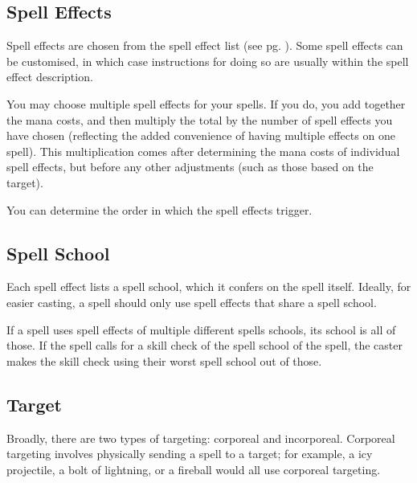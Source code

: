 \subsection{Spell Effects}
Spell effects are chosen from the spell effect list (see pg.
\pageref{spell-effect-list}). Some spell effects can be customised, in which
case instructions for doing so are usually within the spell effect description.

You may choose multiple spell effects for your spells. If you do, you add
together the mana costs, and then multiply the total by the number of spell
effects you have chosen (reflecting the added convenience of having multiple
effects on one spell). This multiplication comes after determining the mana
costs of individual spell effects, but before any other adjustments (such as
those based on the target).

You can determine the order in which the spell effects trigger.

\subsection{Spell School}
Each spell effect lists a spell school, which it confers on the spell itself.
Ideally, for easier casting, a spell should only use spell effects that share
a spell school.

If a spell uses spell effects of multiple different spells schools, its school
is all of those. If the spell calls for a skill check of the spell school of
the spell, the caster makes the skill check using their worst spell school out
of those.

\subsection{Target}
Broadly, there are two types of targeting: corporeal and incorporeal. Corporeal
targeting involves physically sending a spell to a target; for example, a icy
projectile, a bolt of lightning, or a fireball would all use corporeal
targeting.

